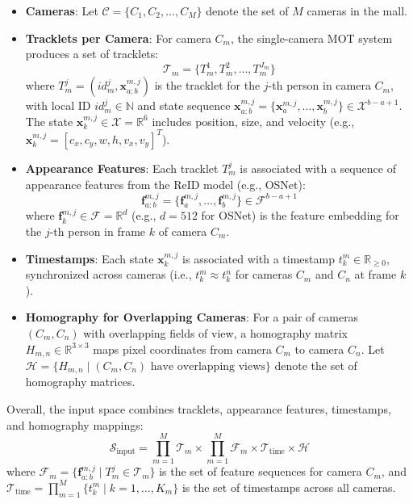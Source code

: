 \documentclass[12pt, a4paper]{article}
\begin{document}
 \begin{itemize}
 	\item \textbf{Cameras}: Let $\mathcal{C} = \{C_1, C_2, \ldots, C_M\}$ denote the set of $M$ cameras in the mall.
 	\item \textbf{Tracklets per Camera}: For camera $C_m$, the single-camera MOT system produces a set of tracklets:
 	\[
 	\mathcal{T}_m = \{ T_m^1, T_m^2, \ldots, T_m^{J_m} \}
 	\]
  where $T_m^j = (id_m^j, \mathbf{x}_{a:b}^{m,j})$ is the tracklet for the $j$-th person in camera $C_m$, with local ID $id_m^j \in \mathbb{N}$ and state sequence $\mathbf{x}_{a:b}^{m,j} = \{\mathbf{x}_a^{m,j}, \ldots, \mathbf{x}_b^{m,j}\} \in \mathcal{X}^{b-a+1}$. The state $\mathbf{x}_k^{m,j} \in \mathcal{X} = \mathbb{R}^6$ includes position, size, and velocity (e.g., $\mathbf{x}_k^{m,j} = [c_x, c_y, w, h, v_x, v_y]^T$).
  	
  	\item \textbf{Appearance Features}: Each tracklet $T_m^j$ is associated with a sequence of appearance features from the ReID model (e.g., OSNet):
  	\[
  	\mathbf{f}_{a:b}^{m,j} = \{\mathbf{f}_a^{m,j}, \ldots, \mathbf{f}_b^{m,j}\} \in \mathcal{F}^{b-a+1}
  	\]
  	where $\mathbf{f}_k^{m,j} \in \mathcal{F} = \mathbb{R}^d$ (e.g., $d=512$ for OSNet) is the feature embedding for the $j$-th person in frame $k$ of camera $C_m$.


	\item \textbf{Timestamps}: Each state $\mathbf{x}_k^{m,j}$ is associated with a timestamp $t_k^m \in \mathbb{R}_{\geq 0}$, synchronized across cameras (i.e., $t_k^m \approx t_k^n$ for cameras $C_m$ and $C_n$ at frame $k$).

	\item \textbf{Homography for Overlapping Cameras}: For a pair of cameras $(C_m, C_n)$ with overlapping fields of view, a homography matrix $H_{m,n} \in \mathbb{R}^{3 \times 3}$ maps pixel coordinates from camera $C_m$ to camera $C_n$. Let $\mathcal{H} = \{ H_{m,n} \mid (C_m, C_n) \text{ have overlapping views} \}$ denote the set of homography matrices.
 \end{itemize}
 
 Overall, the input space combines tracklets, appearance features, timestamps, and homography mappings:
  \[
  \mathcal{S}_{\text{input}} = \prod_{m=1}^M \mathcal{T}_m \times \prod_{m=1}^M \mathcal{F}_m \times \mathcal{T}_{\text{time}} \times \mathcal{H}
  \]
  where $\mathcal{F}_m = \{\mathbf{f}_{a:b}^{m,j} \mid T_m^j \in \mathcal{T}_m\}$ is the set of feature sequences for camera $C_m$, and $\mathcal{T}_{\text{time}} = \prod_{m=1}^M \{t_k^m \mid k=1, \ldots, K_m\}$ is the set of timestamps across all cameras.
\end{document}
